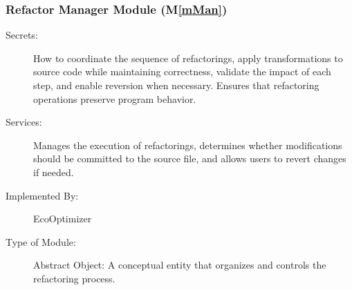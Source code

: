 \documentclass[12pt, titlepage]{article}
\newcommand{\mref}[1]{M\ref{#1}}
\begin{document}
\subsubsection{Refactor Manager Module (\mref{mMan})}

\begin{description}
    \item[Secrets:] How to coordinate the sequence of refactorings, apply transformations to source code while maintaining correctness, validate the impact of each step, and enable reversion when necessary. Ensures that refactoring operations preserve program behavior.

    \item[Services:] Manages the execution of refactorings, determines whether modifications should be committed to the source file, and allows users to revert changes if needed.

    \item[Implemented By:] EcoOptimizer
    \item[Type of Module:] Abstract Object: A conceptual entity that organizes and controls the refactoring process.
\end{description}
\end{document}
